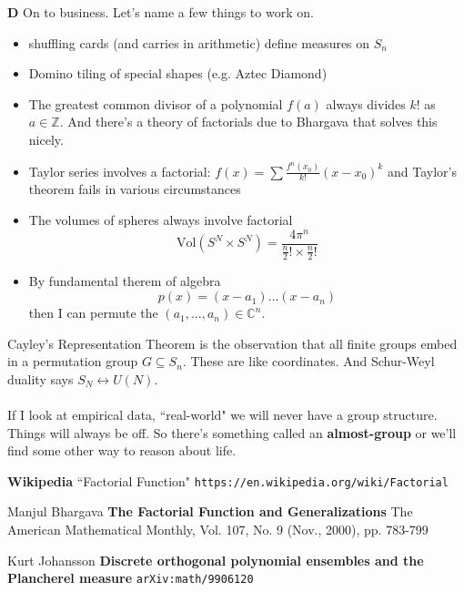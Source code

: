 \documentclass[12pt]{article}
\begin{document}
\newpage

\noindent \textbf{D} On to business.  Let's name a few things to work on.
\begin{itemize}
\item shuffling cards (and carries in arithmetic) define measures on $S_n$
\item Domino tiling of special shapes (e.g. Aztec Diamond) 
\item The greatest common divisor of a polynomial $f(a)$ always divides $k!$ as $a \in \mathbb{Z}$.  And there's a theory of factorials due to Bhargava that solves this nicely.
\item Taylor series involves a factorial: $f(x) = \sum \frac{f^{n}(x_0)}{k!} (x- x_0)^k$ and Taylor's theorem fails in various circumstances
\item The volumes of spheres always involve factorial $$ \mathrm{Vol}(S^N \times S^N) = \frac{4\pi^n}{ \frac{n}{2}! \times \frac{n}{2}! }$$
\item By fundamental therem of algebra $$p(x) = (x-a_1)\dots (x - a_n)$$ then I can permute the $(a_1, \dots, a_n) \in \mathbb{C}^n$.  \\
\end{itemize}
Cayley's Representation Theorem is the observation that all finite groups embed in a permutation group $G \subseteq S_n$. These are like coordinates.  And Schur-Weyl duality says $S_N \leftrightarrow U(N)$. \\ \\
If I look at empirical data, ``real-world" we will never have a group structure.  Things will always be off.  So there's something called an \textbf{almost-group} or we'll find some other way to reason about life.

\newpage

\selectfont \fontsize{12}{10}\selectfont

\begin{thebibliography}{}

\item \textbf{Wikipedia} ``Factorial Function" \texttt{https://en.wikipedia.org/wiki/Factorial}

\item Manjul Bhargava \textbf{The Factorial Function and Generalizations}  The American Mathematical Monthly, Vol. 107, No. 9 (Nov., 2000), pp. 783-799

\item Kurt Johansson \textbf{Discrete orthogonal polynomial ensembles and the Plancherel measure} \texttt{arXiv:math/9906120}

\end{thebibliography}
\end{document}
